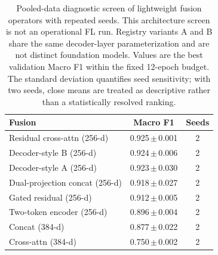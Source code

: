 \begin{table}[t]
\caption{Pooled-data diagnostic screen of lightweight fusion operators
with repeated seeds. This architecture screen is not an operational FL run.
Registry variants
A and B share the same decoder-layer parameterization and are not distinct
foundation models. Values are the best validation Macro F1 within the fixed
12-epoch budget. The standard deviation
quantifies seed sensitivity; with two seeds, close means are treated as
descriptive rather than a statistically resolved ranking.}
\label{tab:fusionvar}
\centering\footnotesize
\begin{tabular}{lcc}
\toprule
Fusion & Macro F1 & Seeds\\
\midrule
Residual cross-attn (256-d) & 0.925\,$\pm$\,0.001 & 2 \\
Decoder-style B (256-d) & 0.924\,$\pm$\,0.006 & 2 \\
Decoder-style A (256-d) & 0.923\,$\pm$\,0.030 & 2 \\
Dual-projection concat (256-d) & 0.918\,$\pm$\,0.027 & 2 \\
Gated residual (256-d) & 0.912\,$\pm$\,0.005 & 2 \\
Two-token encoder (256-d) & 0.896\,$\pm$\,0.004 & 2 \\
Concat (384-d) & 0.877\,$\pm$\,0.022 & 2 \\
Cross-attn (384-d) & 0.750\,$\pm$\,0.002 & 2 \\
\bottomrule
\end{tabular}
\end{table}
